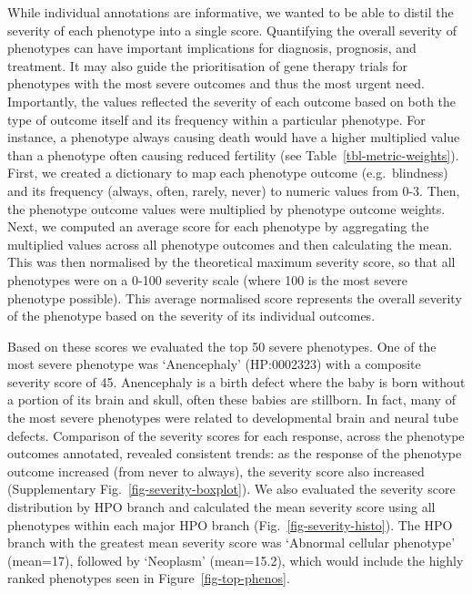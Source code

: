 \documentclass[
]{agujournal2019}
\begin{document}
While individual annotations are informative, we wanted to be able to
distil the severity of each phenotype into a single score. Quantifying
the overall severity of phenotypes can have important implications for
diagnosis, prognosis, and treatment. It may also guide the
prioritisation of gene therapy trials for phenotypes with the most
severe outcomes and thus the most urgent need. Importantly, the values
reflected the severity of each outcome based on both the type of outcome
itself and its frequency within a particular phenotype. For instance, a
phenotype always causing death would have a higher multiplied value than
a phenotype often causing reduced fertility (see
Table~\ref{tbl-metric-weights}). First, we created a dictionary to map
each phenotype outcome (e.g.~blindness) and its frequency (always,
often, rarely, never) to numeric values from 0-3. Then, the phenotype
outcome values were multiplied by phenotype outcome weights. Next, we
computed an average score for each phenotype by aggregating the
multiplied values across all phenotype outcomes and then calculating the
mean. This was then normalised by the theoretical maximum severity
score, so that all phenotypes were on a 0-100 severity scale (where 100
is the most severe phenotype possible). This average normalised score
represents the overall severity of the phenotype based on the severity
of its individual outcomes.

Based on these scores we evaluated the top 50 severe phenotypes. One of
the most severe phenotype was `Anencephaly' (HP:0002323) with a
composite severity score of 45. Anencephaly is a birth defect where the
baby is born without a portion of its brain and skull, often these
babies are stillborn. In fact, many of the most severe phenotypes were
related to developmental brain and neural tube defects. Comparison of
the severity scores for each response, across the phenotype outcomes
annotated, revealed consistent trends: as the response of the phenotype
outcome increased (from never to always), the severity score also
increased (Supplementary Fig.~\ref{fig-severity-boxplot}). We also
evaluated the severity score distribution by HPO branch and calculated
the mean severity score using all phenotypes within each major HPO
branch (Fig.~\ref{fig-severity-histo}). The HPO branch with the greatest
mean severity score was `Abnormal cellular phenotype' (mean=17),
followed by `Neoplasm' (mean=15.2), which would include the highly
ranked phenotypes seen in Figure~\ref{fig-top-phenos}.
\end{document}
